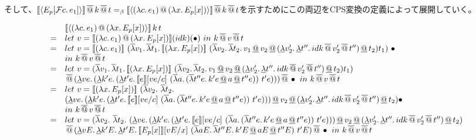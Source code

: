 そして、$[\![{\langle{E_p[{\cal F}{c}.\,{e_1}]}\rangle}]\!]\,\overline{@}\, k \,\overline{@}\, t =_{\beta} [\![{\langle{{(\lambda{c}.\,{e_1})}\,@\,{(\lambda{x}.\,{E_p[x]})}}\rangle}]\!] \,\overline{@}\, k \,\overline{@}\, t$を示すためにこの両辺をCPS変換の定義によって展開していく。\\
\begin{figure}[h]
\[
\begin{array}{cl}
 & \CPSTh{\Prompt{\App{\LamP{c}{e_1}}{\LamP{x}{E_p[x]}}}}\,k\,t\\
 = & let\ v = \CPSTh{\App{\LamP{c}{e_1}}{\LamP{x}{E_p[x]}}}(idk)(\bullet)\ in\ 
  k\SAppS v \SAppS t\\
  = & let\ v = \CPSTh{\LamP{c}{e_1}}\ \SLamP{v_1}{
    \SLam{t_1}{\CPSTh{\LamP{x}{E_p[x]}}\ \SLamP{v_2}{
        \SLam{t_2}{\DApp{\DApp{\DApp{v_1}{v_2}}
                    {\DLamP{v_2'}{\DLam{t''}
                        {\SApp{\SApp{idk}{v_2'}}{t''}}}}}{t_2}}}}t_1} \ \bullet\ \\
  & in\ k\SAppS v \SAppS t\\
  = & let\ v = \SLamP{v_1}{
    \SLam{t_1}{\CPSTh{\LamP{x}{E_p[x]}}\ \SLamP{v_2}{
        \SLam{t_2}{\DApp{\DApp{\DApp{v_1}{v_2}}
                    {\DLamP{v_2'}{\DLam{t''}
                        {\SApp{\SApp{idk}{v_2'}}{t''}}}}}{t_2}}}}t_1} \\
  & \SAppS
  \DLamP{ve}{\DLamP{k'e}{\DLamP{t'e}{\CPSTh{e}[\Change{c}{ve}]\
        \SLamP{a}{\SLamP{t''e}{k'e \DAppS a \DAppS t''e}}\ t'e}}} \SAppS \bullet\ in\
  k\SAppS v \SAppS t\\

  = & let\ v = \CPSTh{\LamP{x}{E_p[x]}}\ (\SLamS v_2.\ 
  \SLamS t_2.\ \\
   & \DApp{\DApp{\DApp{\DLamP{ve}{\DLamP{k'e}{\DLamP{t'e}{\CPSTh{e}[\Change{c}{ve}]\
        \SLamP{a}{\SLamP{t''e}{k'e \DAppS a \DAppS t''e}}\ t'e}}}}{v_2}}
                    {\DLamP{v_2'}{\DLam{t''}
                        {\SApp{\SApp{idk}{v_2'}}{t''}}}}}{t_2})\bullet\\
  & in\ k\SAppS v \SAppS t\\

  = & let\ v = (\SLamS v_2.\ 
  \SLamS t_2.\ 
  \DApp{\DApp{\DApp{\DLamP{ve}{\DLamP{k'e}{\DLamP{t'e}{\CPSTh{e}[\Change{c}{ve}]\
        \SLamP{a}{\SLamP{t''e}{k'e \DAppS a \DAppS t''e}}\ t'e}}}}{v_2}}
                    {\DLamP{v_2'}{\DLam{t''}
                        {\SApp{\SApp{idk}{v_2'}}{t''}}}}}{t_2})\\
  & \SAppS \DLamP{vE}{\DLam{k'E}{\DLam{t'E}{\CPSTh{E_p[x]}[\Change{x}{vE}]\
  \SLamP{aE}{\SLam{t''E}{k'E \DAppS aE \DAppS t''E}}\ t'E}}} \SAppS \bullet \ in\
  k\SAppS v \SAppS t\\


\end{array}\]
\end{figure}
